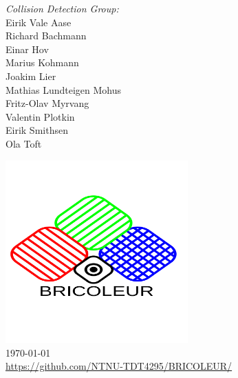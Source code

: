 \begin{titlepage}
\begin{minipage}{0.4\textwidth}
\begin{center} \large
\emph{Collision Detection Group:}\\
\small
Eirik Vale Aase\\
Richard Bachmann\\
Einar Hov\\
Marius Kohmann\\ 
Joakim Lier\\
Mathias Lundteigen Mohus\\
Fritz-Olav Myrvang\\
Valentin Plotkin\\
Eirik Smithsen\\
Ola Toft
\normalsize
\end{center}
\end{minipage}

\includegraphics[width=7cm, height=7cm]{Images/bricoleur.png}\\

\vskip 1cm
\today\\
\url{https://github.com/NTNU-TDT4295/BRICOLEUR/}
\vfill

\vfill %

\end{titlepage}
